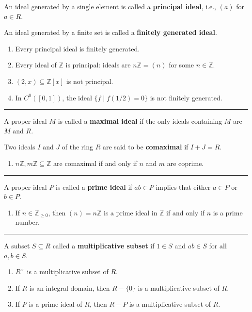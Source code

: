 \documentclass[12pt]{article}
\newcommand{\keyword}[1]{\textbf{#1}}
\newcommand{\sepline}{\rule{\textwidth}{0.4pt}}
\theoremstyle{definition}
\newcommand{\Z}{\mathbb{Z}}
\newcommand{\Zpos}{\mathbb{Z}_{\geq0}}
\newcommand{\<}{\left\langle}
\renewcommand{\>}{\right\rangle}
\begin{document}
An ideal generated by a single element is called a \keyword{principal ideal}, i.e., $(a)$ for $a \in R$.

An ideal generated by a finite set is called a \keyword{finitely generated ideal}.

\begin{enumerate}
    \item Every principal ideal is finitely generated.
    
    \item Every ideal of $\Z$ is principal: ideals are $n\Z = (n)$ for some $n \in \Z$.
    
    \item $(2, x) \subseteq \Z[x]$ is not principal.
    
    \item In $C^0([0,1])$, the ideal $\{f \mid f(1/2) = 0\}$ is not finitely generated.
\end{enumerate}

\sepline

A proper ideal $M$ is called a \keyword{maximal ideal} if the only ideals containing $M$ are $M$ and $R$.

Two ideals $I$ and $J$ of the ring $R$ are said to be \keyword{comaximal} if $I + J = R$.

\begin{enumerate}
    \item $n\Z, m\Z \subseteq \Z$ are comaximal if and only if $n$ and $m$ are coprime.
\end{enumerate}

\sepline

A proper ideal $P$ is called a \keyword{prime ideal} if $ab \in P$ implies that either $a \in P$ or $b \in P$.

\begin{enumerate}
    \item If $n \in \Zpos$, then $(n) = n\Z$ is a prime ideal in $\Z$ if and only if $n$ is a prime number.
\end{enumerate}

\sepline

A subset $S \subseteq R$ called a \keyword{multiplicative subset} if $1 \in S$ and $ab \in S$ for all $a, b \in S$. 

\begin{enumerate}
    \item $R^\times$ is a multiplicative subset of $R$.
    
    \item If $R$ is an integral domain, then $R - \{0\}$ is a multiplicative subset of $R$.
    
    \item If $P$ is a prime ideal of $R$, then $R - P$ is a multiplicative subset of $R$.
\end{enumerate}
\end{document}

